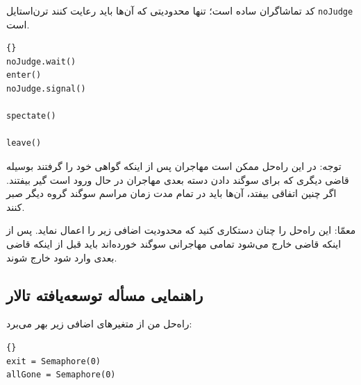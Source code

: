 \documentclass{book}
\newcommand{\clearemptydoublepage}{\newpage\cleardoublepage}
\begin{document}
    کد تماشاگران ساده است؛ تنها محدودیتی که  آن‌ها باید رعایت کنند ترن‌استایل  {\tt noJudge} است.

\begin{latin}
\begin{lstlisting}[title=\rl{راهنمایی مسأله تالار \lr{Faneuil} (تماشاگر)}]{}
noJudge.wait()
enter()
noJudge.signal()

spectate()

leave()
\end{lstlisting}
\end{latin}

    توجه: در این راه‌حل ممکن است مهاجران پس از اینکه گواهی خود را گرفتند بوسیله قاضی‌ دیگری که برای سوگند دادن دسته بعدی 
    مهاجران در حال ورود است گیر بیفتند. اگر چنین اتفاقی بیفتد، آن‌ها باید در تمام مدت زمان مراسم سوگند گروه دیگر صبر کنند. 

    معمّا: این راه‌حل را چنان دستکاری کنید که محدودیت اضافی زیر را اعمال نماید. پس از اینکه قاضی خارج می‌شود تمامی مهاجرانی سوگند خورده‌اند 
    باید قبل از اینکه قاضی بعدی وارد شود خارج شوند. 


\clearemptydoublepage
\subsection{راهنمایی مسأله توسعه‌یافته تالار }

    راه‌حل من از متغیرهای اضافی زیر بهر می‌برد:‌

\begin{latin}
\begin{lstlisting}[title=\rl{راهنمایی مسأله تالار \lr{Faneuil}}]{}
exit = Semaphore(0)
allGone = Semaphore(0)
\end{lstlisting}
\end{latin}
\end{document}

